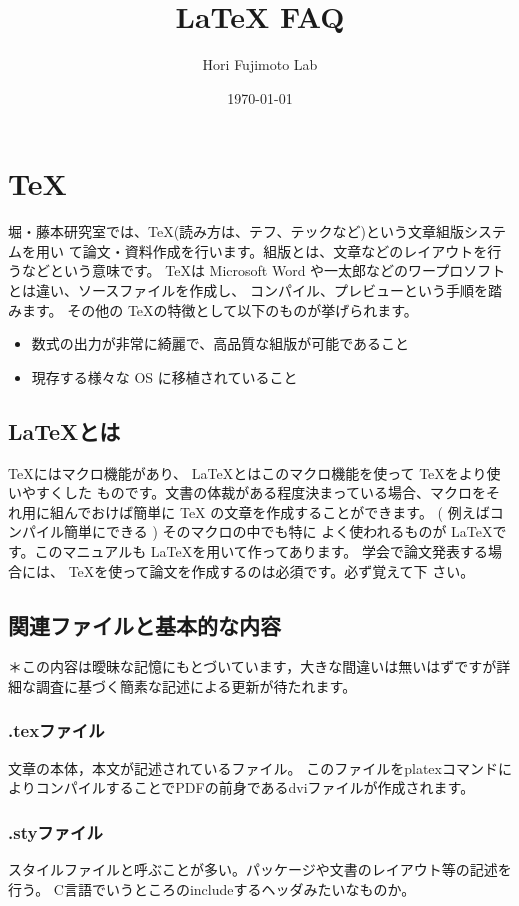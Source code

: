 \documentclass[10pt,a4paper,oneside,twocolumn,fleqn,dvipdfmx]{jsarticle}
\title{{\LaTeX} FAQ}
\author{Hori Fujimoto Lab}
\date{\today}
\begin{document}
\maketitle

\section{\TeX}
堀・藤本研究室では、\TeX (読み方は、テフ、テックなど)という文章組版システムを用い
て論文・資料作成を行います。組版とは、文章などのレイアウトを行うなどという意味です。
\TeX は Microsoft Word や一太郎などのワープロソフトとは違い、ソースファイルを作成し、
コンパイル、プレビューという手順を踏みます。
その他の \TeX の特徴として以下のものが挙げられます。

\begin{itemize}
	\item  数式の出力が非常に綺麗で、高品質な組版が可能であること
	\item 現存する様々な OS に移植されていること
\end{itemize}

\subsection{\LaTeX とは}
\TeX にはマクロ機能があり、 \LaTeX とはこのマクロ機能を使って \TeX をより使いやすくした
ものです。文書の体裁がある程度決まっている場合、マクロをそれ用に組んでおけば簡単に \TeX
の文章を作成することができます。 ( 例えばコンパイル簡単にできる ) そのマクロの中でも特に
よく使われるものが \LaTeX です。このマニュアルも \LaTeX を用いて作ってあります。
学会で論文発表する場合には、 \TeX を使って論文を作成するのは必須です。必ず覚えて下
さい。

\subsection{関連ファイルと基本的な内容}
＊この内容は曖昧な記憶にもとづいています，大きな間違いは無いはずですが詳細な調査に基づく簡素な記述による更新が待たれます。
\subsubsection*{.texファイル}
文章の本体，本文が記述されているファイル。
このファイルをplatexコマンドによりコンパイルすることでPDFの前身であるdviファイルが作成されます。
\subsubsection*{.styファイル}
スタイルファイルと呼ぶことが多い。パッケージや文書のレイアウト等の記述を行う。
C言語でいうところのincludeするヘッダみたいなものか。
\end{document}
